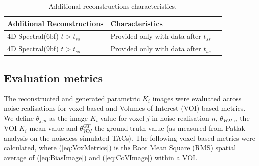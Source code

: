 \begin{table}[h!]
\caption{\label{tab:ReconstructionNamesTss}Additional reconstructions characteristics.}
\begin{tabular}{lll}
\toprule
\textbf{Additional Reconstructions} & \textbf{Characteristics}  \\
\midrule
4D Spectral(6bf) $t>t_{ss}$ & Provided only with data after $t_{ss}$  & \\
4D Spectral(9bf) $t>t_{ss}$ & Provided only with data after $t_{ss}$  & \\
\toprule
\end{tabular}
\end{table}

\subsection*{Evaluation metrics}
The reconstructed and generated parametric $K_i$ images were evaluated across noise realisations for voxel based and Volumes of Interest (VOI) based metrics. We define $\theta_{j,n}$ as the image $K_i$ value for voxel $j$ in noise realisation $n$, $\theta_{VOI,n}$ the VOI $K_i$ mean value and $\theta_{VOI}^{GT}$ the ground truth value (as measured from Patlak analysis on the noiseless simulated TACs). The following voxel-based metrics were calculated, where (\ref{eq:VoxMetrics}) is the Root Mean Square (RMS) spatial average of (\ref{eq:BiasImage}) and (\ref{eq:CoVImage}) within a VOI.


